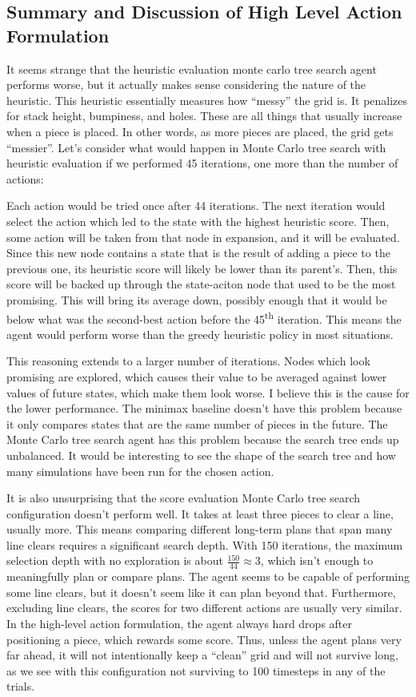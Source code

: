 \documentclass[letterpaper]{article} %
\begin{document}
\subsection{Summary and Discussion of High Level Action Formulation}

It seems strange that the heuristic evaluation monte carlo tree search agent performs worse, but it actually makes sense considering the nature of the heuristic. This heuristic essentially measures how ``messy'' the grid is. It penalizes for stack height, bumpiness, and holes. These are all things that usually increase when a piece is placed. In other words, as more pieces are placed, the grid gets ``messier''. Let's consider what would happen in Monte Carlo tree search with heuristic evaluation if we performed 45 iterations, one more than the number of actions:

Each action would be tried once after 44 iterations. The next iteration would select the action which led to the state with the highest heuristic score. Then, some action will be taken from that node in expansion, and it will be evaluated. Since this new node contains a state that is the result of adding a piece to the previous one, its heuristic score will likely be lower than its parent's. Then, this score will be backed up through the state-aciton node that used to be the most promising. This will bring its average down, possibly enough that it would be below what was the second-best action before the 45\textsuperscript{th} iteration. This means the agent would perform worse than the greedy heuristic policy in most situations.

This reasoning extends to a larger number of iterations. Nodes which look promising are explored, which causes their value to be averaged against lower values of future states, which make them look worse. I believe this is the cause for the lower performance. The minimax baseline doesn't have this problem because it only compares states that are the same number of pieces in the future. The Monte Carlo tree search agent has this problem because the search tree ends up unbalanced. It would be interesting to see the shape of the search tree and how many simulations have been run for the chosen action.

It is also unsurprising that the score evaluation Monte Carlo tree search configuration doesn't perform well. It takes at least three pieces to clear a line, usually more. This means comparing different long-term plans that span many line clears requires a significant search depth. With 150 iterations, the maximum selection depth with no exploration is about \(\frac{150}{44} \approx 3\), which isn't enough to meaningfully plan or compare plans. The agent seems to be capable of performing some line clears, but it doesn't seem like it can plan beyond that. Furthermore, excluding line clears, the scores for two different actions are usually very similar. In the high-level action formulation, the agent always hard drops after positioning a piece, which rewards some score. Thus, unless the agent plans very far ahead, it will not intentionally keep a ``clean'' grid and will not survive long, as we see with this configuration not surviving to 100 timesteps in any of the trials.
\end{document}
